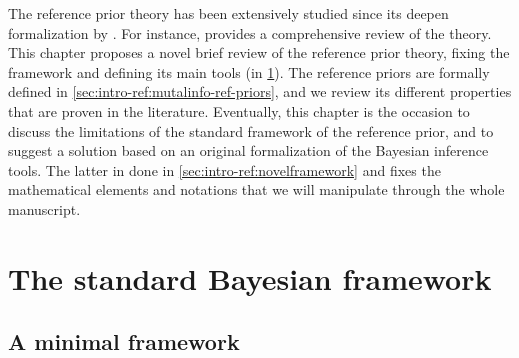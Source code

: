 The reference prior theory has been extensively studied since its deepen formalization by \citet{berger_formal_2009}. For instance, \citet{mure_objective_2018} provides a comprehensive review of the theory.
This chapter proposes a novel brief review of the reference prior theory, fixing the framework and defining its main tools (in \cref{sec:intro-ref:classical-framework}). %
The reference priors are formally defined in \cref{sec:intro-ref:mutalinfo-ref-priors}, and we review its different properties that are proven in the literature.
Eventually, this chapter is the occasion to discuss the limitations of the standard framework of the reference prior, and to suggest a solution based on an original formalization of the Bayesian inference tools.  The latter in done in \cref{sec:intro-ref:novelframework} and fixes the mathematical elements and notations that we will manipulate through the whole manuscript.











\section{The standard Bayesian framework}\label{sec:intro-ref:classical-framework}

\subsection{A minimal framework}\label{sec:intro-ref:minimalclassicframework}

